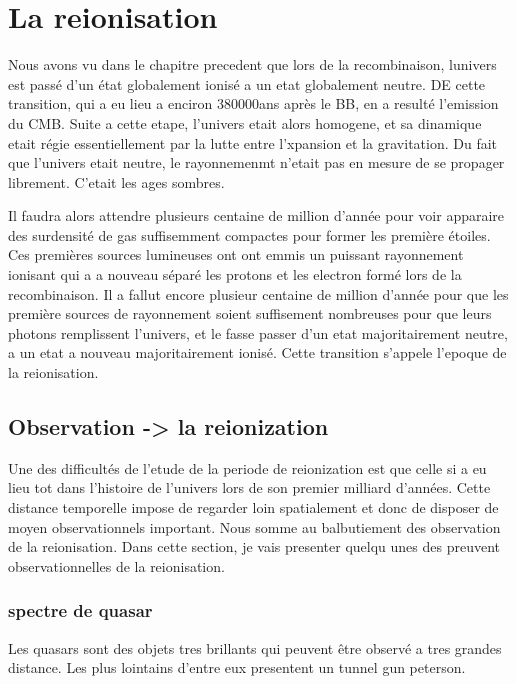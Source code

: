 \chapter{La reionisation } 
Nous avons vu dans le chapitre precedent que lors de la recombinaison, lunivers est passé d'un état globalement ionisé a un etat globalement neutre.
DE cette transition, qui a eu lieu a enciron 380000ans après le BB, en a resulté l'emission du CMB.
Suite a cette etape, l'univers etait alors homogene, et sa dinamique etait régie essentiellement par la lutte entre l'xpansion et la gravitation.
Du fait que l'univers etait neutre, le rayonnemenmt n'etait pas en mesure de se propager librement.
C'etait les ages sombres.

Il faudra alors attendre plusieurs centaine de million d'année pour voir apparaire des surdensité de gas suffisemment compactes pour former les première étoiles.
Ces premières sources lumineuses ont ont emmis un puissant rayonnement ionisant qui a a nouveau séparé les protons et les electron formé lors de la recombinaison.
Il a fallut encore plusieur centaine de million d'année pour que les première sources de rayonnement soient suffisement nombreuses pour que leurs photons remplissent l'univers, et le fasse passer d'un etat majoritairement neutre, a un etat a nouveau majoritairement ionisé. 
Cette transition s'appele l'epoque de la reionisation.



\section{Observation -> la reionization}

Une des difficultés de l'etude de la periode de reionization est que celle si a eu lieu tot dans l'histoire de l'univers lors de son premier milliard d'années.
Cette distance temporelle impose de regarder loin spatialement et donc de disposer de moyen observationnels important.
Nous somme au balbutiement des observation de la reionisation.
Dans cette section, je vais presenter quelqu unes des preuvent observationnelles de la reionisation. 




\subsection{spectre de quasar}
Les quasars sont des objets tres brillants qui peuvent être observé a tres grandes distance.
Les plus lointains d'entre eux presentent  un tunnel gun peterson.

